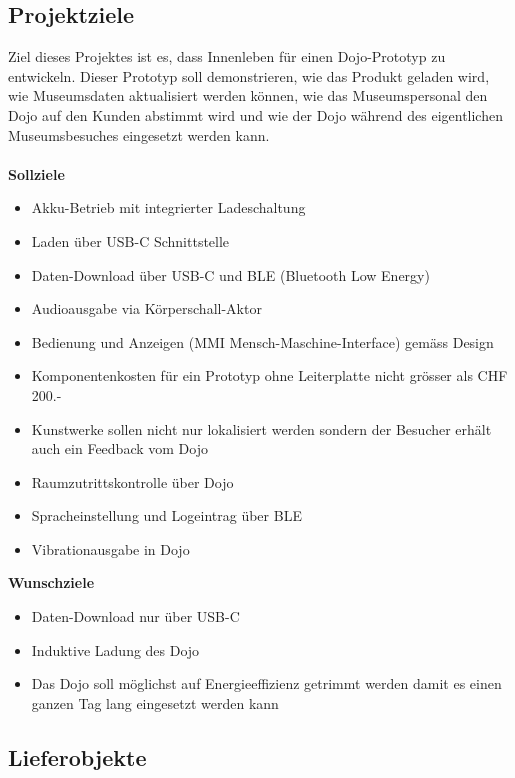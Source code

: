 \documentclass[10pt,a4paper,oneside]{99_fhnwreport}
\begin{document}
\subsection{Projektziele}
Ziel dieses Projektes ist es, dass Innenleben für einen Dojo-Prototyp zu entwickeln. Dieser Prototyp soll demonstrieren, wie das Produkt geladen wird, wie Museumsdaten aktualisiert werden können, wie das Museumspersonal den Dojo auf den Kunden abstimmt wird und wie der Dojo während des eigentlichen Museumsbesuches eingesetzt werden kann.\\
\\
\textbf{Sollziele}
\begin{itemize}
\item{Akku-Betrieb mit integrierter Ladeschaltung}
\item{Laden über USB-C Schnittstelle}
\item{Daten-Download über USB-C und BLE (Bluetooth Low Energy)}
\item{Audioausgabe via Körperschall-Aktor}
\item{Bedienung und Anzeigen (MMI  Mensch-Maschine-Interface) gemäss Design}
\item{Komponentenkosten für ein Prototyp ohne Leiterplatte nicht grösser als CHF 200.- }
\item{Kunstwerke sollen nicht nur lokalisiert werden sondern der Besucher erhält auch ein Feedback vom Dojo}
\item{Raumzutrittskontrolle über Dojo}
\item{Spracheinstellung und Logeintrag über BLE}
\item{Vibrationausgabe in Dojo}
\end{itemize}

\textbf{Wunschziele}
\begin{itemize}
\item{Daten-Download nur über USB-C}
\item{Induktive Ladung des Dojo}
\item{Das Dojo soll möglichst auf Energieeffizienz getrimmt werden damit es einen ganzen Tag lang eingesetzt werden kann}
\end{itemize}

\subsection{Lieferobjekte}
\end{document}
